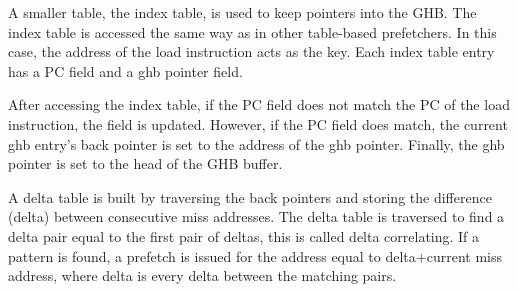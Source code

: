 A smaller table, the index table, is used to keep pointers into the
GHB. The index table is accessed the same way as in other table-based
prefetchers. In this case, the address of the load instruction acts as
the key. Each index table entry has a PC field and a ghb pointer
field.

After accessing the index table, if the PC field does not match the PC
of the load instruction, the field is updated. However, if the PC
field does match, the current ghb entry's back pointer is set to the
address of the ghb pointer. Finally, the ghb pointer is set to the
head of the GHB buffer.

A delta table is built by traversing the back pointers and storing the
difference (delta) between consecutive miss addresses. The delta table
is traversed to find a delta pair equal to the first pair of deltas,
this is called delta correlating. If a pattern is found, a prefetch is
issued for the address equal to delta$+$current miss address, where
delta is every delta between the matching pairs.
